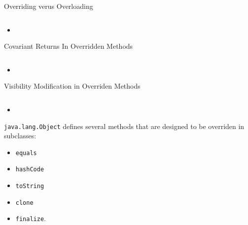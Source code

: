 \documentclass{beamer}
\begin{document}
\begin{frame}[fragile]{Overriding verus Overloading}


\begin{lstlisting}[language=Java]

\end{lstlisting}

\begin{itemize}
\item
\end{itemize}


\end{frame}


\begin{frame}[fragile]{Covariant Returns In Overridden Methods}


\begin{lstlisting}[language=Java]

\end{lstlisting}

\begin{itemize}
\item
\end{itemize}


\end{frame}

\begin{frame}[fragile]{Visibility Modification in Overriden Methods}


\begin{lstlisting}[language=Java]

\end{lstlisting}

\begin{itemize}
\item
\end{itemize}


\end{frame}

\begin{frame}[fragile]{}


{\tt java.lang.Object} defines several methods that are designed to be overriden in subclasses: 
\begin{itemize}
\item {\tt equals}
\item {\tt hashCode}
\item {\tt toString}
\item {\tt clone}
\item {\tt finalize}.
\end{itemize}


\end{frame}
\end{document}
